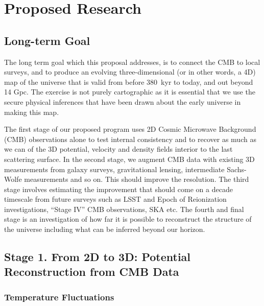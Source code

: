\documentclass[psfig,11pt]{article}
\begin{document}


\section{Proposed Research}

\subsection{Long-term Goal}

The long term goal which this proposal addresses, is to connect the CMB to local surveys, and to produce an evolving three-dimensional (or in other words, a 4D) map of the universe that is valid from before 380~kyr to today, and out beyond 14 Gpc. The exercise is not purely cartographic as it is essential that we use the secure physical inferences that have been drawn about the early universe in making this map.

The first stage of our proposed program uses 2D Cosmic Microwave Background (CMB) observations alone to test internal consistency and to recover as much as we can of the 3D potential, velocity and density fields interior to the last scattering surface. In the second stage, we augment CMB data with existing 3D measurements from galaxy surveys, gravitational lensing, intermediate Sachs-Wolfe measurements and so on. This should improve the resolution. The third stage involves estimating the improvement that should come on a decade timescale from future surveys such as LSST and Epoch of Reionization investigations, ``Stage IV'' CMB observations, SKA etc. The fourth and final stage is an investigation of how far it is possible to reconstruct the structure of the universe including what can be inferred beyond our horizon.


\subsection{Stage 1. From 2D to 3D: Potential Reconstruction from CMB Data}

\subsubsection{Temperature Fluctuations}
\end{document}
